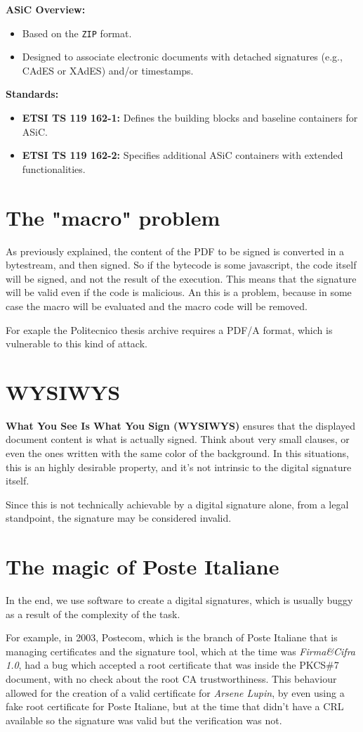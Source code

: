 \textbf{ASiC Overview:}
\begin{itemize}
    \item Based on the \texttt{ZIP} format.
    \item Designed to associate electronic documents with detached
      signatures (e.g., CAdES or XAdES) and/or timestamps.
\end{itemize}

\textbf{Standards:}
\begin{itemize}
    \item \textbf{ETSI TS 119 162-1:} Defines the building blocks and
      baseline containers for ASiC.
    \item \textbf{ETSI TS 119 162-2:} Specifies additional ASiC
      containers with extended functionalities.
\end{itemize}

\section{The "macro" problem}
As previously explained, the content of the PDF to be signed is
converted in a bytestream, and then signed. So if the bytecode is some
javascript, the code itself will be signed, and not the result of the
execution. This means that the signature will be valid even if the 
code is malicious. An this is a problem, because in some case the
macro will be evaluated and the macro code will be removed.

For exaple the Politecnico thesis archive requires a PDF/A format,
which is vulnerable to this kind of attack.

\section{WYSIWYS}
\textbf{What You See Is What You Sign (WYSIWYS)} ensures that the
displayed document content is what is actually signed. 
Think about very small clauses, or even the ones written with the same
color of the background. In this situations, this is an highly
desirable property, and it's not intrinsic to the digital signature 
itself.

Since this is not technically achievable by a digital signature alone,
from a legal standpoint, the signature may be considered invalid.

\section{The magic of Poste Italiane}
In the end, we use software to create a digital signatures, which is
usually buggy as a result of the complexity of the task. 

For example, in 2003, Postecom, which is the branch of Poste Italiane
that is managing certificates and the signature tool, which at the
time was \textit{Firma\&Cifra 1.0}, had a bug which accepted a root
certificate that was inside the PKCS\#7 document, with no check about
the root CA trustworthiness. This behaviour allowed for the creation
of a valid certificate for \textit{Arsene Lupin}, by even using a fake
root certificate for Poste Italiane, but at the time that
didn't have a CRL available so the signature was valid but the
verification was not.
